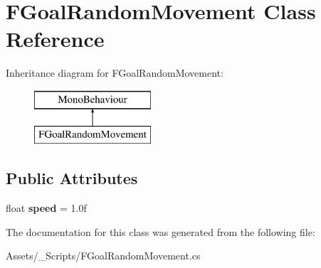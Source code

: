 \hypertarget{class_f_goal_random_movement}{}\section{F\+Goal\+Random\+Movement Class Reference}
\label{class_f_goal_random_movement}
Inheritance diagram for F\+Goal\+Random\+Movement\+:\begin{figure}[H]
\begin{center}
\leavevmode
\includegraphics[height=2.000000cm]{class_f_goal_random_movement}
\end{center}
\end{figure}
\subsection*{Public Attributes}
\begin{DoxyCompactItemize}
\item 
\mbox{\label{class_f_goal_random_movement_ab8e8d3b133e795e552e50bab68fa335b}} 
float {\bfseries speed} = 1.\+0f
\end{DoxyCompactItemize}


The documentation for this class was generated from the following file\+:\begin{DoxyCompactItemize}
\item 
Assets/\+\_\+\+Scripts/F\+Goal\+Random\+Movement.\+cs\end{DoxyCompactItemize}

